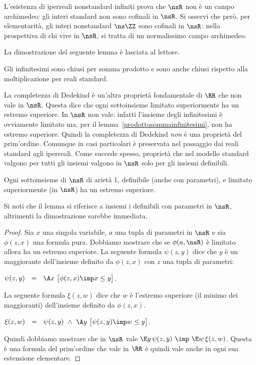 L'esistenza di iperreali nonstandard infiniti prova che $\nsR$ non \`e un campo archimedeo: gli interi standard non sono cofinali in $\nsR$. Si osservi che per\`o, per elementarit\`a, gli interi nonstandard $\ns\ZZ$ sono cofinali in $\nsR$: nella prospettiva di chi vive in $\nsR$, si tratta di un normalissimo campo archimedeo. 

La dimostrazione del seguente lemma \`e lasciata al lettore.

\begin{lemma}\label{prodottosommainfinitesimi}
Gli infinitesimi sono chiusi per somma prodotto e sono anche chiusi rispetto alla moltiplicazione per reali standard.
\end{lemma}

La completezza di Dedekind \`e un'altra propriet\`a fondamentale di $\RR$ che non vale in $\nsR$. Questa dice che ogni sottoinsieme limitato superiormente ha un estremo superiore. In $\nsR$ non vale: infatti l'insieme degli infinitesimi \`e ovviamente limitato ma, per il lemma~\ref{prodottosommainfinitesimi}, non ha estremo superiore. Quindi la completezza di Dedekind \textit{non\/} \`e una propriet\`a del prim'ordine. Comunque in casi particolari \`e preservata nel passaggio dai reali standard agli iperreali. Come succede spesso, propriet\`a che nel modello standard valgono per tutti gli insiemi valgono in $\nsR$ solo per gli insiemi definibili.
 
\begin{lemma}\label{dedekindcomplete}
Ogni sottoinsieme di $\nsR$ di ariet\`a 1, definibile (anche con parametri), e limitato superiormente (in $\nsR$) ha un estremo superiore.
\end{lemma}

Si noti che il lemma si riferisce a insiemi i definibili con parametri in $\nsR$, altrimenti la dimostrazione sarebbe immediata.

\begin{proof}  Sia $x$ una singola variabile, $a$ una tupla di parametri in $\nsR$ e sia $\phi(z,x)$ una formula pura. Dobbiamo mostrare che se $\phi(a,\nsR)$ \`e limitato allora ha un estremo superiore. La seguente formula $\psi(z,y)$ dice che $y$ \`e un maggiorante dell'insieme definito da $\phi(z,x)$ con $z$ una tupla di parametri:

\hfil $\psi(z,y)\ \ =\ \  \A x\ \big[\phi(z,x)\imp x\le y\big]$.

La seguente formula $\xi(z,w)$ dice che $w$ \`e l'estremo superiore (il minimo dei maggioranti) dell'insieme definito da $\phi(z,x)$. 

\hfil $\xi(z,w)\ \ =\ \  \psi(z,y)\ \wedge\ \A y\ \big[\psi(z,y)\imp w\le y\big]$.

Quindi dobbiamo mostrare che in $\nsR$ vale $\E y\,\psi(z,y)\ \imp\ \E w\,\xi(z,w)$. Questa \`e una formula del prim'ordine che vale in $\RR$ \`e quindi vale anche in ogni sua estensione elementare.
\end{proof}

